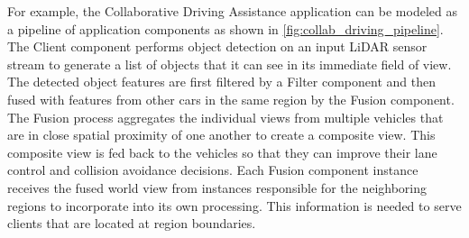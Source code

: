 \par For example, the Collaborative Driving Assistance application can be modeled as a pipeline of application components as shown in \cref{fig:collab_driving_pipeline}. The Client component performs object detection on an input LiDAR sensor stream to generate a list of objects that it can see in its immediate field of view. The detected object features are first filtered by a Filter component and then fused with features from other cars in the same region by the Fusion component. The Fusion process aggregates the individual views from multiple vehicles that are in close spatial proximity of one another to create a composite view. This composite view is fed back to the vehicles so that they can improve their lane control and collision avoidance decisions. Each Fusion component instance receives the fused world view from instances responsible for the neighboring regions to incorporate into its own processing. This information is needed to serve clients that are located at region boundaries.

